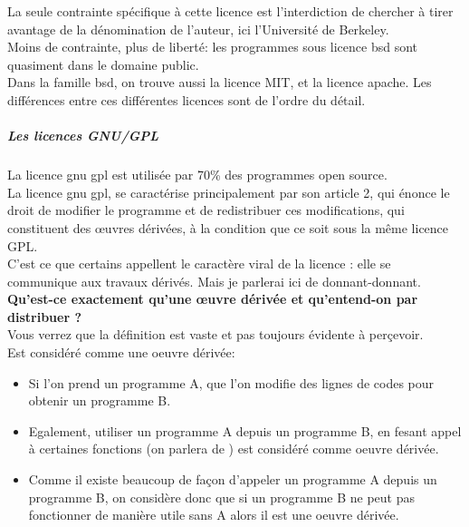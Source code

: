						La seule contrainte spécifique à cette licence est l'interdiction de chercher à tirer avantage de la dénomination de l'auteur, ici l'Université de Berkeley.\\

						Moins de contrainte, plus de liberté: les programmes sous licence \acrshort{bsd} sont quasiment dans le domaine public.\\

						Dans la famille \acrshort{bsd}, on trouve aussi la licence MIT, et la licence \Gls{apache}. Les différences entre ces différentes licences sont de l'ordre du détail.

					\subparagraph{Les licences GNU/GPL\\}

						La licence \acrfull{gnu gpl} est utilisée par 70\% des programmes open source.\\ 
				
						La licence \acrshort{gnu gpl}, se caractérise principalement par son article 2, qui énonce le droit de modifier le programme et de redistribuer ces modifications, qui constituent des œuvres dérivées, à la condition que ce soit sous la même licence GPL. \\
				
						C'est ce que certains appellent le caractère viral de la licence : elle se communique aux travaux dérivés. Mais je parlerai ici de donnant-donnant. \\
				
						\textbf{Qu'est-ce exactement qu'une œuvre dérivée et qu'entend-on par distribuer ?}\\

						Vous verrez que la définition est vaste et pas toujours évidente à perçevoir.\\

						Est considéré comme une oeuvre dérivée:

						\begin{itemize}[label=\textbullet, font=\LARGE \color{burntorange}]
							\item Si l'on prend un programme A, que l'on modifie des lignes de codes pour obtenir un programme B.
							\item Egalement, utiliser un programme A depuis un programme B, en fesant appel à certaines fonctions (on parlera de ) est considéré comme oeuvre dérivée.
							\item Comme il existe beaucoup de façon d'appeler un programme A depuis un programme B, on considère donc que si un programme B ne peut pas fonctionner de manière utile sans A alors il est une oeuvre dérivée.
						\end{itemize} 

